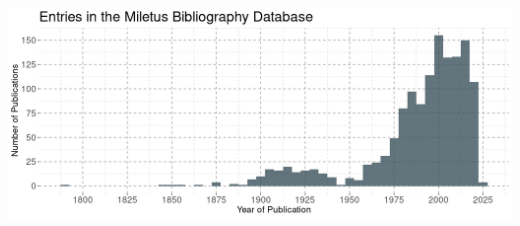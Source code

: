 \documentclass[a4paper,openany]{scrbook}
\begin{document}


\newpage
\begin{multicols}{2}
    \tableofcontents
\end{multicols}

\newpage




\vfill
\includegraphics[width=\textwidth]{../out/figures/mil-pubs-by-year.png}


\begin{flushleft}%
\newpage



 

\end{flushleft}
 
\end{document}
